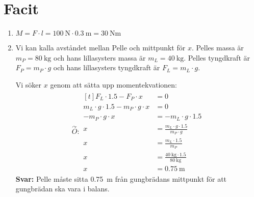 \documentclass[11pt]{article}
\begin{document}
\raggedright
\setcounter{section}{3}

\newpage
\section*{Facit \thesection}
\begin{enumerate}[itemsep=2em]
        \item
              \begin{minipage}[t]{0.5\textwidth}
                      $M = F \cdot l = \SI{100}{\newton} \cdot \SI{0.3}{\meter} = \SI{30}{\newton\metre}$
              \end{minipage}
              \hspace{1em}
              \begin{adjustbox}{valign=t}
                      
              \end{adjustbox}
        \item
              Vi kan kalla avståndet mellan Pelle och mittpunkt för $x$. Pelles massa är $m_P = \SI{80}{\kilogram}$ och hans lillasysters massa är $m_L = \SI{40}{\kilogram}$. Pelles tyngdkraft är $F_P = m_P \cdot g$ och hans lillasysters tyngdkraft är $F_L = m_L \cdot g$.

              Vi söker $x$ genom att sätta upp momentekvationen:
              \begin{align*}
                      \overset{\curvearrowright}{O} : \begin{aligned}[t]
                                                              F_L \cdot 1.5 - F_P \cdot x                 & = 0                                                       \\
                                                              m_L \cdot g \cdot 1.5 - m_P \cdot g \cdot x & = 0                                                       \\
                                                              -m_P \cdot g \cdot x                        & = -m_L \cdot g \cdot 1.5                                  \\
                                                              x                                           & = \frac{m_L \cdot g \cdot 1.5}{m_P \cdot g}               \\
                                                              x                                           & = \frac{m_L \cdot 1.5}{m_P}                               \\
                                                              x                                           & = \frac{\SI{40}{\kilogram} \cdot 1.5}{\SI{80}{\kilogram}} \\
                                                              x                                           & = \SI{0.75}{\meter}
                                                      \end{aligned}
              \end{align*}
              \textbf{Svar:} Pelle måste sitta \SI{0.75}{\meter} från gungbrädans mittpunkt för att gungbrädan ska vara i balans.


\end{enumerate}
\end{document}
